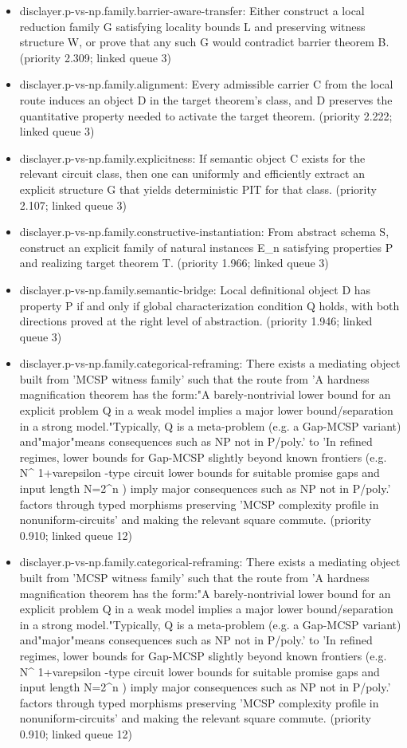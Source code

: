 \documentclass[11pt]{article}
\begin{document}
\begin{itemize}
\item disclayer.p-vs-np.family.barrier-aware-transfer: Either construct a local reduction family G satisfying locality bounds L and preserving witness structure W, or prove that any such G would contradict barrier theorem B. (priority 2.309; linked queue 3)
\item disclayer.p-vs-np.family.alignment: Every admissible carrier C from the local route induces an object D in the target theorem's class, and D preserves the quantitative property needed to activate the target theorem. (priority 2.222; linked queue 3)
\item disclayer.p-vs-np.family.explicitness: If semantic object C exists for the relevant circuit class, then one can uniformly and efficiently extract an explicit structure G that yields deterministic PIT for that class. (priority 2.107; linked queue 3)
\item disclayer.p-vs-np.family.constructive-instantiation: From abstract schema S, construct an explicit family of natural instances E\_n satisfying properties P and realizing target theorem T. (priority 1.966; linked queue 3)
\item disclayer.p-vs-np.family.semantic-bridge: Local definitional object D has property P if and only if global characterization condition Q holds, with both directions proved at the right level of abstraction. (priority 1.946; linked queue 3)
\item disclayer.p-vs-np.family.categorical-reframing: There exists a mediating object built from 'MCSP witness family' such that the route from 'A hardness magnification theorem has the form:"A barely-nontrivial lower bound for an explicit problem Q in a weak model implies a major lower bound/separation in a strong model."Typically, Q is a meta-problem (e.g. a Gap-MCSP variant) and"major"means consequences such as NP not in P/poly.' to 'In refined regimes, lower bounds for Gap-MCSP slightly beyond known frontiers (e.g. N\textasciicircum{} 1+varepsilon -type circuit lower bounds for suitable promise gaps and input length N=2\textasciicircum{}n ) imply major consequences such as NP not in P/poly.' factors through typed morphisms preserving 'MCSP complexity profile in nonuniform-circuits' and making the relevant square commute. (priority 0.910; linked queue 12)
\item disclayer.p-vs-np.family.categorical-reframing: There exists a mediating object built from 'MCSP witness family' such that the route from 'A hardness magnification theorem has the form:"A barely-nontrivial lower bound for an explicit problem Q in a weak model implies a major lower bound/separation in a strong model."Typically, Q is a meta-problem (e.g. a Gap-MCSP variant) and"major"means consequences such as NP not in P/poly.' to 'In refined regimes, lower bounds for Gap-MCSP slightly beyond known frontiers (e.g. N\textasciicircum{} 1+varepsilon -type circuit lower bounds for suitable promise gaps and input length N=2\textasciicircum{}n ) imply major consequences such as NP not in P/poly.' factors through typed morphisms preserving 'MCSP complexity profile in nonuniform-circuits' and making the relevant square commute. (priority 0.910; linked queue 12)

\end{itemize}
\end{document}
